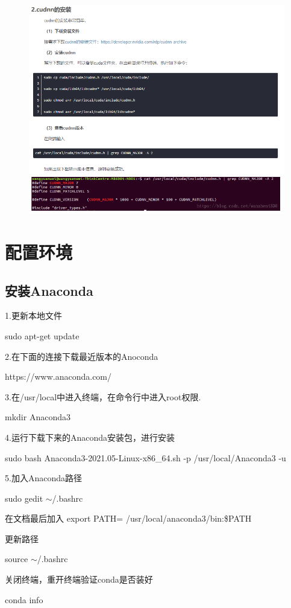 \documentclass[openbib]{article}
\begin{document}
\begin{figure}[H]
	\centering
	\includegraphics[scale=0.4]{52}
\end{figure}
\section{配置环境}
\subsection{安装Anaconda}
1.更新本地文件

sudo apt-get update

2.在下面的连接下载最近版本的Anoconda

https://www.anaconda.com/

3.在/usr/local中进入终端，在命令行中进入root权限.

mkdir Anaconda3

4.运行下载下来的Anaconda安装包，进行安装

sudo bash Anaconda3-2021.05-Linux-x86\_64.sh -p /usr/local/Anaconda3 -u 

5.加入Anaconda路径

sudo gedit $\sim$/.bashrc

在文档最后加入
export PATH= /usr/local/anaconda3/bin:\$PATH

更新路径

source $\sim$/.bashrc

关闭终端，重开终端验证conda是否装好

conda info
\end{document}
